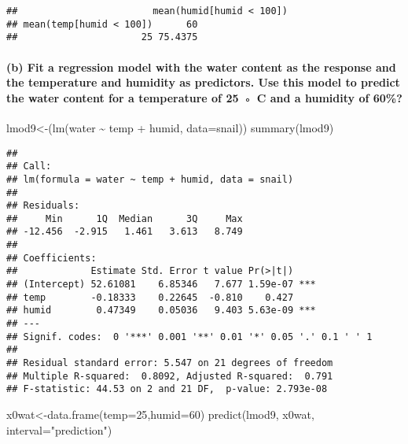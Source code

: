 \documentclass[
]{article}
\newenvironment{Shaded}{\begin{snugshade}}{\end{snugshade}}
\newcommand{\AttributeTok}[1]{\textcolor[rgb]{0.77,0.63,0.00}{#1}}
\newcommand{\DecValTok}[1]{\textcolor[rgb]{0.00,0.00,0.81}{#1}}
\newcommand{\FunctionTok}[1]{\textcolor[rgb]{0.00,0.00,0.00}{#1}}
\newcommand{\NormalTok}[1]{#1}
\newcommand{\OtherTok}[1]{\textcolor[rgb]{0.56,0.35,0.01}{#1}}
\newcommand{\SpecialCharTok}[1]{\textcolor[rgb]{0.00,0.00,0.00}{#1}}
\newcommand{\StringTok}[1]{\textcolor[rgb]{0.31,0.60,0.02}{#1}}
\begin{document}
\begin{verbatim}
##                        mean(humid[humid < 100])
## mean(temp[humid < 100])      60
##                      25 75.4375
\end{verbatim}

\hypertarget{b-fit-a-regression-model-with-the-water-content-as-the-response-and-the-temperature-and-humidity-as-predictors.-use-this-model-to-predict-the-water-content-for-a-temperature-of-25-c-and-a-humidity-of-60}{%
\paragraph{(b) Fit a regression model with the water content as the
response and the temperature and humidity as predictors. Use this model
to predict the water content for a temperature of 25 ◦ C and a humidity
of
60\%?}\label{b-fit-a-regression-model-with-the-water-content-as-the-response-and-the-temperature-and-humidity-as-predictors.-use-this-model-to-predict-the-water-content-for-a-temperature-of-25-c-and-a-humidity-of-60}}

\begin{Shaded}
\begin{Highlighting}[]
\NormalTok{lmod9}\OtherTok{\textless{}{-}}\NormalTok{(}\FunctionTok{lm}\NormalTok{(water }\SpecialCharTok{\textasciitilde{}}\NormalTok{ temp }\SpecialCharTok{+}\NormalTok{ humid, }\AttributeTok{data=}\NormalTok{snail))}
\FunctionTok{summary}\NormalTok{(lmod9)}
\end{Highlighting}
\end{Shaded}

\begin{verbatim}
## 
## Call:
## lm(formula = water ~ temp + humid, data = snail)
## 
## Residuals:
##     Min      1Q  Median      3Q     Max 
## -12.456  -2.915   1.461   3.613   8.749 
## 
## Coefficients:
##             Estimate Std. Error t value Pr(>|t|)    
## (Intercept) 52.61081    6.85346   7.677 1.59e-07 ***
## temp        -0.18333    0.22645  -0.810    0.427    
## humid        0.47349    0.05036   9.403 5.63e-09 ***
## ---
## Signif. codes:  0 '***' 0.001 '**' 0.01 '*' 0.05 '.' 0.1 ' ' 1
## 
## Residual standard error: 5.547 on 21 degrees of freedom
## Multiple R-squared:  0.8092, Adjusted R-squared:  0.791 
## F-statistic: 44.53 on 2 and 21 DF,  p-value: 2.793e-08
\end{verbatim}

\begin{Shaded}
\begin{Highlighting}[]
\NormalTok{x0wat}\OtherTok{\textless{}{-}}\FunctionTok{data.frame}\NormalTok{(}\AttributeTok{temp=}\DecValTok{25}\NormalTok{,}\AttributeTok{humid=}\DecValTok{60}\NormalTok{)}
\FunctionTok{predict}\NormalTok{(lmod9, x0wat, }\AttributeTok{interval=}\StringTok{"prediction"}\NormalTok{)}
\end{Highlighting}
\end{Shaded}
\end{document}
